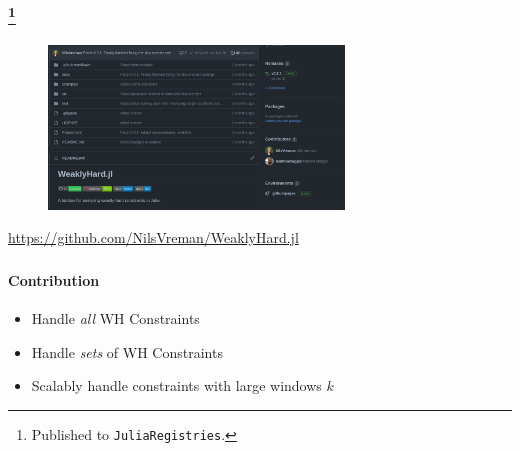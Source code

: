 \begin{frame}
    \frametitle{\tool{}\footnote{Published to \texttt{JuliaRegistries}.}}
    \begin{figure}[h]
        \centering
        \includegraphics[width=0.7\textwidth]{figs/rtas22b/git.png}
    \end{figure}

    \begin{center}
        \Large
        \textcolor{hicolour}{\url{https://github.com/NilsVreman/WeaklyHard.jl}}
    \end{center}
\end{frame}

\begin{frame}
    \frametitle{\tool{}}
    \framesubtitle{Contribution}

    \begin{itemize}\setlength\itemsep{1em}
        \item Handle \emph{all} WH Constraints
        \item Handle \emph{sets} of WH Constraints
        \item Scalably handle constraints with large windows $k$
    \end{itemize}
\end{frame}
